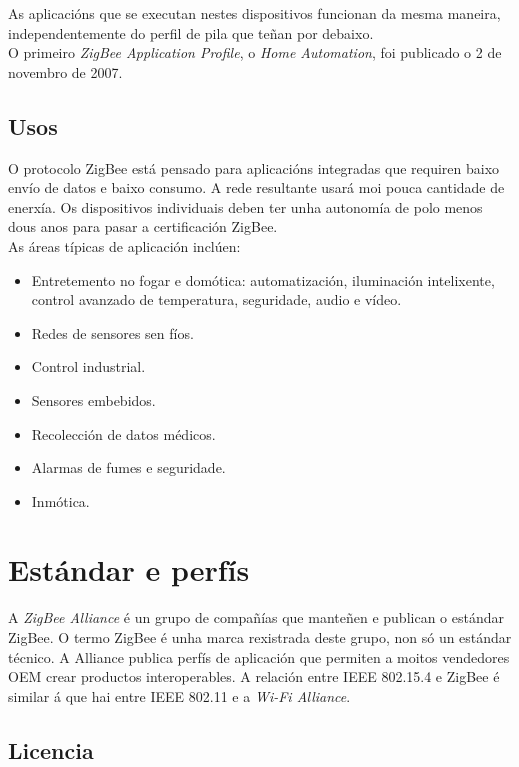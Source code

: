   As aplicacións que se executan nestes dispositivos funcionan da mesma
  maneira, independentemente do perfil de pila que teñan por debaixo. \\

  O primeiro \textit{ZigBee Application Profile}, o \textit{Home Automation},
  foi publicado o 2 de novembro de 2007.

 \subsection{Usos}

 O protocolo ZigBee está pensado para aplicacións integradas que requiren
 baixo envío de datos e baixo consumo. A rede resultante usará moi pouca
 cantidade de enerxía. Os dispositivos individuais deben ter unha autonomía de
 polo menos dous anos para pasar a certificación ZigBee. \\

 As áreas típicas de aplicación inclúen:

 \begin{itemize}
  \item Entretemento no fogar e domótica: automatización, iluminación
        intelixente, control avanzado de temperatura, seguridade, audio e
        vídeo.
  \item Redes de sensores sen fíos.
  \item Control industrial.
  \item Sensores embebidos.
  \item Recolección de datos médicos.
  \item Alarmas de fumes e seguridade.
  \item Inmótica.
 \end{itemize}

\section{Estándar e perfís}

A \textit{ZigBee Alliance} é un grupo de compañías que manteñen e publican o
estándar ZigBee. O termo ZigBee é unha marca rexistrada deste grupo, non só un
estándar técnico. A Alliance publica perfís de aplicación que permiten a moitos
vendedores OEM crear productos interoperables. A relación entre IEEE 802.15.4 e
ZigBee é similar á que hai entre IEEE 802.11 e a
\textit{Wi-Fi Alliance}.

 \subsection{Licencia}

